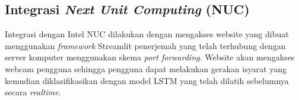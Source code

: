 \subsection{Integrasi \emph{Next Unit Computing} (NUC)}
\label{subsec:integrasiNUC}

Integrasi dengan Intel NUC dilakukan dengan mengakses website yang dibuat menggunakan \emph{framework} Streamlit penerjemah yang telah terhubung dengan server komputer menggunakan skema \emph{port forwarding}. Website akan mengakses webcam pengguna sehingga pengguna dapat melakukan gerakan isyarat yang kemudian diklasifikasikan dengan model LSTM yang telah dilatih sebelumnya secara \emph{realtime}.












